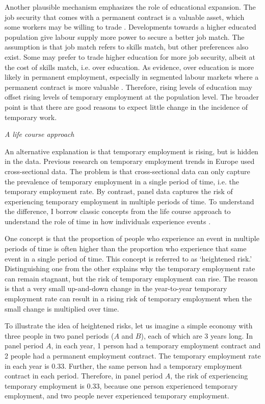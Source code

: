 \documentclass[12pt]{article}
\begin{document}
Another plausible mechanism emphasizes the role of educational expansion.  The job security that comes with a permanent contract is a valuable asset, which some workers may be willing to trade \citep{ortiz_mcguiness_2018}.  Developments towards a higher educated population give labour supply more power to secure a better job match.  The assumption is that job match refers to skills match, but other preferences also exist.  Some may prefer to trade higher education for more job security, albeit at the cost of skills match, i.e. over education.  As evidence, over education is more likely in permanent employment, especially in segmented labour markets where a permanent contract is more valuable \citep{ortiz_2010}.  Therefore, rising levels of education may offset rising levels of temporary employment at the population level.  The broader point is that there are good reasons to expect little change in the incidence of temporary work.

\emph{A life course approach}

An alternative explanation is that temporary employment is rising, but is hidden in the data.  Previous research on temporary employment trends in Europe used cross-sectional data.  The problem is that cross-sectional data can only capture the prevalence of temporary employment in a single period of time, i.e. the temporary employment rate.  By contrast, panel data captures the risk of experiencing temporary employment in multiple periods of time.  To understand the difference, I borrow classic concepts from the life course approach to understand the role of time in how individuals experience events \citep{mayer_tuma_1990}.

One concept is that the proportion of people who experience an event in multiple periods of time is often higher than the proportion who experience that same event in a single period of time.  This concept is referred to as `heightened risk.'  Distinguishing one from the other explains why the temporary employment rate can remain stagnant, but the risk of temporary employment can rise.  The reason is that a very small up-and-down change in the year-to-year temporary employment rate can result in a rising risk of temporary employment when the small change is multiplied over time.

To illustrate the idea of heightened risks, let us imagine a simple economy with three people in two panel periods ($A$ and $B$), each of which are 3 years long.  In panel period $A$, in each year, 1 person had a temporary employment contract and 2 people had a permanent employment contract.  The temporary employment rate in each year is 0.33.  Further, the same person had a temporary employment contract in each period.  Therefore, in panel period $A$, the risk of experiencing temporary employment is 0.33, because one person experienced temporary employment, and two people never experienced temporary employment.  
\end{document}
